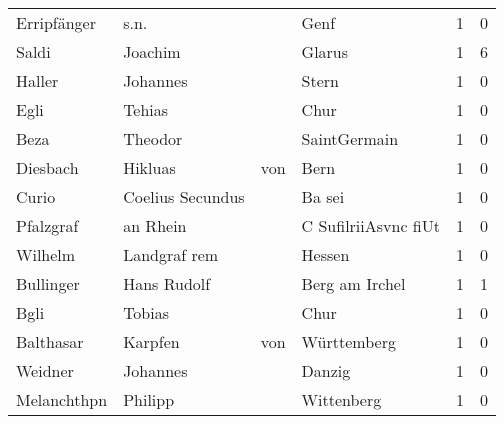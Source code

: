 \begin{tabular}{llllrr}
              Erripfänger &                               s.n. &             &                                        Genf &          1 &         0 \\
                    Saldi &                            Joachim &             &                                      Glarus &          1 &         6 \\
                   Haller &                           Johannes &             &                                       Stern &          1 &         0 \\
                     Egli &                             Tehias &             &                                        Chur &          1 &         0 \\
                     Beza &                            Theodor &             &                                SaintGermain &          1 &         0 \\
                 Diesbach &                            Hikluas &         von &                                        Bern &          1 &         0 \\
                    Curio &                   Coelius Secundus &             &                                      Ba sei &          1 &         0 \\
                Pfalzgraf &                           an Rhein &             &                        C SufilriiAsvnc fiUt &          1 &         0 \\
                  Wilhelm &                       Landgraf rem &             &                                      Hessen &          1 &         0 \\
                Bullinger &                        Hans Rudolf &             &                              Berg am Irchel &          1 &         1 \\
                     Bgli &                             Tobias &             &                                        Chur &          1 &         0 \\
                Balthasar &                            Karpfen &         von &                                 Württemberg &          1 &         0 \\
                  Weidner &                           Johannes &             &                                      Danzig &          1 &         0 \\
              Melanchthpn &                            Philipp &             &                                  Wittenberg &          1 &         0 \\

\end{tabular}
